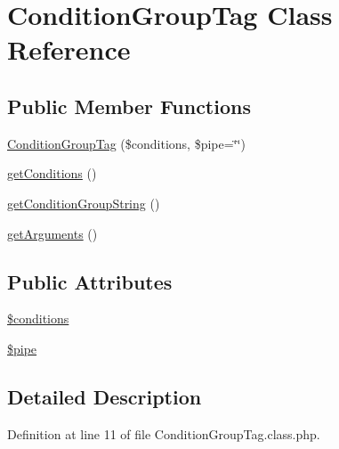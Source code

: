 \hypertarget{classConditionGroupTag}{\section{Condition\+Group\+Tag Class Reference}
\label{classConditionGroupTag}
}
\subsection*{Public Member Functions}
\begin{DoxyCompactItemize}
\item 
\hyperlink{classConditionGroupTag_a8fc7849474c6d2438761a4677d4dc3b7}{Condition\+Group\+Tag} (\$conditions, \$pipe=\char`\"{}\char`\"{})
\item 
\hyperlink{classConditionGroupTag_a7c73e801b9044cacf7bdfdcd718d4939}{get\+Conditions} ()
\item 
\hyperlink{classConditionGroupTag_a7bf3bb17f13f21b6c2765dced1638d85}{get\+Condition\+Group\+String} ()
\item 
\hyperlink{classConditionGroupTag_a39eb41f124f6a58e4afe873c2cb4ce6e}{get\+Arguments} ()
\end{DoxyCompactItemize}
\subsection*{Public Attributes}
\begin{DoxyCompactItemize}
\item 
\hyperlink{classConditionGroupTag_a19efbd0ebcee51dbec82581f0044fb1f}{\$conditions}
\item 
\hyperlink{classConditionGroupTag_af3040978080a9af0e9f8760eb05cc58b}{\$pipe}
\end{DoxyCompactItemize}


\subsection{Detailed Description}


Definition at line 11 of file Condition\+Group\+Tag.\+class.\+php.



